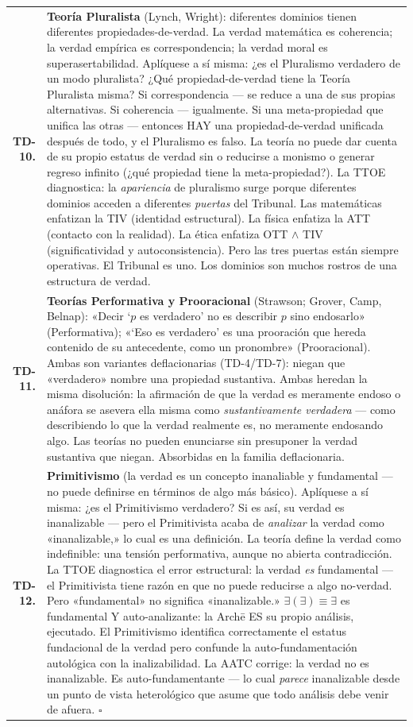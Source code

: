 \documentclass[10pt, openany, oneside]{book}
\renewcommand{\footnotesize}{\fontsize{8.5}{11}\selectfont}
\begin{document}
{\footnotesize
\noindent\begin{tabular}{r p{}}
\textbf{TD-10.} & \textbf{Teoría Pluralista} (Lynch, Wright): diferentes dominios tienen diferentes propiedades-de-verdad. La verdad matemática es coherencia; la verdad empírica es correspondencia; la verdad moral es superasertabilidad. Aplíquese a sí misma: ¿es el Pluralismo verdadero de un modo pluralista? ¿Qué propiedad-de-verdad tiene la Teoría Pluralista misma? Si correspondencia --- se reduce a una de sus propias alternativas. Si coherencia --- igualmente. Si una meta-propiedad que unifica las otras --- entonces HAY una propiedad-de-verdad unificada después de todo, y el Pluralismo es falso. La teoría no puede dar cuenta de su propio estatus de verdad sin o reducirse a monismo o generar regreso infinito (¿qué propiedad tiene la meta-propiedad?). La TTOE diagnostica: la \textit{apariencia} de pluralismo surge porque diferentes dominios acceden a diferentes \textit{puertas} del Tribunal. Las matemáticas enfatizan la TIV (identidad estructural). La física enfatiza la ATT (contacto con la realidad). La ética enfatiza OTT $\wedge$ TIV (significatividad y autoconsistencia). Pero las tres puertas están siempre operativas. El Tribunal es uno. Los dominios son muchos rostros de una estructura de verdad. \\[0.3em]
\textbf{TD-11.} & \textbf{Teorías Performativa y Prooracional} (Strawson; Grover, Camp, Belnap): «Decir `$p$ es verdadero' no es describir $p$ sino endosarlo» (Performativa); «`Eso es verdadero' es una prooración que hereda contenido de su antecedente, como un pronombre» (Prooracional). Ambas son variantes deflacionarias (TD-4/TD-7): niegan que «verdadero» nombre una propiedad sustantiva. Ambas heredan la misma disolución: la afirmación de que la verdad es meramente endoso o anáfora se asevera ella misma como \textit{sustantivamente verdadera} --- como describiendo lo que la verdad realmente es, no meramente endosando algo. Las teorías no pueden enunciarse sin presuponer la verdad sustantiva que niegan. Absorbidas en la familia deflacionaria. \\[0.3em]
\textbf{TD-12.} & \textbf{Primitivismo} (la verdad es un concepto inanaliable y fundamental --- no puede definirse en términos de algo más básico). Aplíquese a sí misma: ¿es el Primitivismo verdadero? Si es así, su verdad es inanalizable --- pero el Primitivista acaba de \textit{analizar} la verdad como «inanalizable,» lo cual es una definición. La teoría define la verdad como indefinible: una tensión performativa, aunque no abierta contradicción. La TTOE diagnostica el error estructural: la verdad \textit{es} fundamental --- el Primitivista tiene razón en que no puede reducirse a algo no-verdad. Pero «fundamental» no significa «inanalizable.» $\exists(\exists) \equiv \exists$ es fundamental Y auto-analizante: la Arch\={e} ES su propio análisis, ejecutado. El Primitivismo identifica correctamente el estatus fundacional de la verdad pero confunde la auto-fundamentación autológica con la inalizabilidad. La AATC corrige: la verdad no es inanalizable. Es auto-fundamentante --- lo cual \textit{parece} inanalizable desde un punto de vista heterológico que asume que todo análisis debe venir de afuera. $\square$ \\[0.3em]

\end{tabular}}
\end{document}
